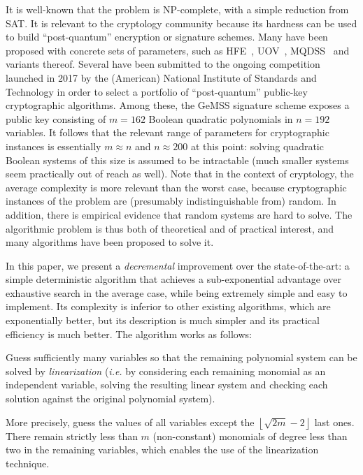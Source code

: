 \documentclass[a4paper,UKenglish,cleveref, autoref]{lipics-v2019}
\begin{document}
It is well-known that the problem is NP-complete, with a simple reduction from
SAT. It is relevant to the cryptology community because its hardness can be used
to build ``post-quantum'' encryption or signature schemes. Many have been
proposed with concrete sets of parameters, such as HFE~\cite{Patarin96},
UOV~\cite{KipnisPG99}, MQDSS~\cite{ChenHRSS16} and variants thereof. Several
have been submitted to the ongoing competition launched in 2017 by the
(American) National Institute of Standards and Technology in order to select a
portfolio of ``post-quantum'' public-key cryptographic algorithms. Among these,
the \textsf{GeMSS} signature scheme exposes a public key consisting of $m=162$
Boolean quadratic polynomials in $n=192$ variables. It follows that the relevant
range of parameters for cryptographic instances is essentially $m \approx n$ and
$n \approx 200$ at this point:
solving quadratic Boolean systems of this size is assumed to be intractable
(much smaller systems seem practically out of reach as well). Note that in the
context of cryptology, the average complexity is more relevant than the worst
case, because cryptographic instances of the problem are (presumably
indistinguishable from) random. In addition, there is empirical evidence that
random systems are hard to solve. The algorithmic problem is thus both of
theoretical and of practical interest, and many algorithms have been proposed to
solve it.

In this paper, we present a \emph{decremental} improvement over the
state-of-the-art: a simple deterministic algorithm that achieves a
sub-exponential advantage over exhaustive search in the average case, while
being extremely simple and easy to implement. Its complexity is inferior to
other existing algorithms, which are exponentially better, but its description
is much simpler and its practical efficiency is much better. The algorithm works
as follows:

\begin{framed}
  Guess sufficiently many variables so that the remaining polynomial system can
  be solved by \emph{linearization} (\textit{i.e.} by considering each remaining
  monomial as an independent variable, solving the resulting linear system and
  checking each solution against the original polynomial system).
\end{framed}

More precisely, guess the values of all variables except the
$\left\lfloor \sqrt{2m} - 2 \right\rfloor$ last ones. There remain strictly
less than $m$ (non-constant) monomials of degree less than two in the remaining
variables, which enables the use of the linearization technique.
\end{document}
